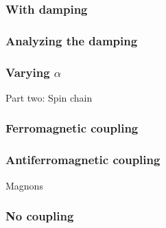 \documentclass{beamer}
\begin{document}
\begin{frame}
    \frametitle{With damping}
    \begin{figure}
    \centering
    
\end{figure}
\end{frame}

\begin{frame}
    \frametitle{Analyzing the damping}
\begin{figure}
    \centering
    
\end{figure}
\end{frame}

\begin{frame}
    \frametitle{Varying $\alpha$}
\begin{figure}
    \centering
    
\end{figure}
\end{frame}



\begin{frame}
    \vfill
    \centering
    Part two: Spin chain
    \vfill
\end{frame}


\begin{frame}
    \frametitle{Ferromagnetic coupling}
\begin{figure}
    \centering
    
\end{figure}
\end{frame}

\begin{frame}
    \frametitle{Antiferromagnetic coupling}
\begin{figure}
    \centering
    
\end{figure}
\end{frame}

\begin{frame}
    \vfill
    \centering
    Magnons
    \vfill
\end{frame}

\begin{frame}
    \frametitle{No coupling}
\begin{figure}
    \centering
    
\end{figure}
\end{frame}
\end{document}
